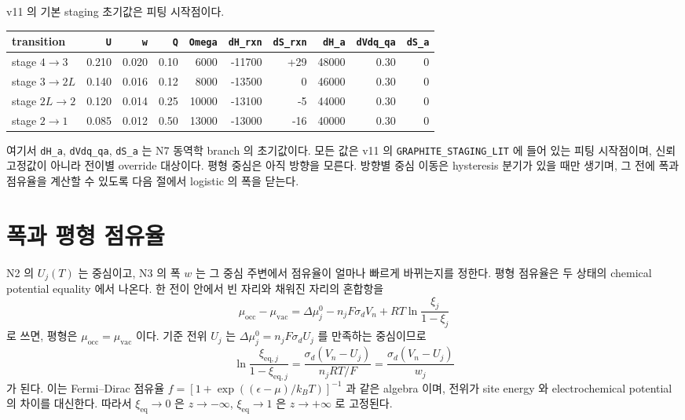 \documentclass[11pt,a4paper]{article}
\newcommand{\eq}{\mathrm{eq}}
\begin{document}
v11 의 기본 staging 초기값은 피팅 시작점이다.
\begin{center}
\renewcommand{\arraystretch}{1.25}
\begin{tabular}{lrrrrrrrrr}
\toprule
transition & \texttt{U} & \texttt{w} & \texttt{Q} & \texttt{Omega} & \texttt{dH\_rxn} & \texttt{dS\_rxn} & \texttt{dH\_a} & \texttt{dVdq\_qa} & \texttt{dS\_a}\\
\midrule
stage $4\to3$ & 0.210 & 0.020 & 0.10 & 6000 & -11700 & +29 & 48000 & 0.30 & 0\\
stage $3\to2L$ & 0.140 & 0.016 & 0.12 & 8000 & -13500 & 0 & 46000 & 0.30 & 0\\
stage $2L\to2$ & 0.120 & 0.014 & 0.25 & 10000 & -13100 & -5 & 44000 & 0.30 & 0\\
stage $2\to1$ & 0.085 & 0.012 & 0.50 & 13000 & -13000 & -16 & 40000 & 0.30 & 0\\
\bottomrule
\end{tabular}
\end{center}
여기서 \texttt{dH\_a}, \texttt{dVdq\_qa}, \texttt{dS\_a} 는 N7 동역학 branch 의 초기값이다. 모든 값은 v11 의 \texttt{GRAPHITE\_STAGING\_LIT} 에 들어 있는 피팅 시작점이며, 신뢰 고정값이 아니라 전이별 override 대상이다.
평형 중심은 아직 방향을 모른다. 방향별 중심 이동은 hysteresis 분기가 있을 때만 생기며, 그 전에 폭과 점유율을 계산할 수 있도록 다음 절에서 logistic 의 폭을 닫는다.

\section{폭과 평형 점유율}\label{sec:n3}
N2 의 $U_j(T)$ 는 중심이고, N3 의 폭 $w$ 는 그 중심 주변에서 점유율이 얼마나 빠르게 바뀌는지를 정한다. 평형 점유율은 두 상태의 chemical potential equality 에서 나온다. 한 전이 안에서 빈 자리와 채워진 자리의 혼합항을
\begin{equation}
\mu_{\mathrm{occ}}-\mu_{\mathrm{vac}}
=\Delta\mu_j^0-n_jF\sigma_d V_n
+RT\ln\frac{\xi_j}{1-\xi_j}
\label{eq:mueqraw}
\end{equation}
로 쓰면, 평형은 $\mu_{\mathrm{occ}}=\mu_{\mathrm{vac}}$ 이다. 기준 전위 $U_j$ 는 $\Delta\mu_j^0=n_jF\sigma_d U_j$ 를 만족하는 중심이므로
\begin{equation}
\ln\frac{\xi_{\eq,j}}{1-\xi_{\eq,j}}
=\frac{\sigma_d(V_n-U_j)}{n_jRT/F}
=\frac{\sigma_d(V_n-U_j)}{w_j}
\label{eq:logitsolve}
\end{equation}
가 된다. 이는 Fermi--Dirac 점유율 $f=[1+\exp((\epsilon-\mu)/k_BT)]^{-1}$ 과 같은 algebra 이며, 전위가 site energy 와 electrochemical potential 의 차이를 대신한다. 따라서 $\xi_{\eq}\to0$ 은 $z\to-\infty$, $\xi_{\eq}\to1$ 은 $z\to+\infty$ 로 고정된다.
\end{document}
